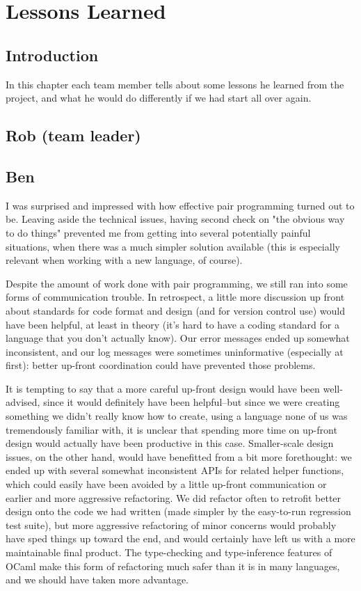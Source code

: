 
\chapter{Lessons Learned}

\section{Introduction}
In this chapter each team member tells about some lessons he learned from
the project, and what he would do differently if we had start all over
again.

\section{Rob (team leader)}

\section{Ben}

I was surprised and impressed with how effective pair programming turned out to be.
Leaving aside the technical issues, having  second check on "the obvious way to do things"
prevented me from getting into several potentially painful situations, when there was a
much simpler solution available (this is especially relevant when working with a new 
language, of course).

Despite the amount of work done with pair programming, we still ran into some 
forms of communication trouble.  In retrospect, a little more discussion up front
about standards for code format and design (and for version control use) would 
have been helpful, at least in theory (it's hard to have a 
coding standard for a language that you don't actually know).  
Our error messages ended up 
somewhat inconsistent, and our log messages were sometimes uninformative (especially at first):
better up-front coordination could have prevented those problems.  

It is tempting to say that a more careful up-front design would have been well-advised, since it would 
definitely have been helpful--but since we were creating something we didn't really know how to create,
using a language none of us was tremendously familiar with, it is unclear that spending more time on
up-front design would actually have been productive in this case.  
Smaller-scale design issues, on the other hand, would have benefitted from a bit more forethought:
we ended up with several somewhat inconsistent APIs for related helper functions, which could easily have been avoided by a little up-front communication or earlier and more aggressive refactoring.
We did refactor often to retrofit better design onto the code we had written (made simpler by the easy-to-run regression test suite), but more aggressive refactoring of minor concerns would probably have sped things up toward the end, and would certainly have left us  with a more maintainable final product.  The type-checking and type-inference features of OCaml make this form of refactoring much safer than it is in many languages, and we should have taken more advantage.

